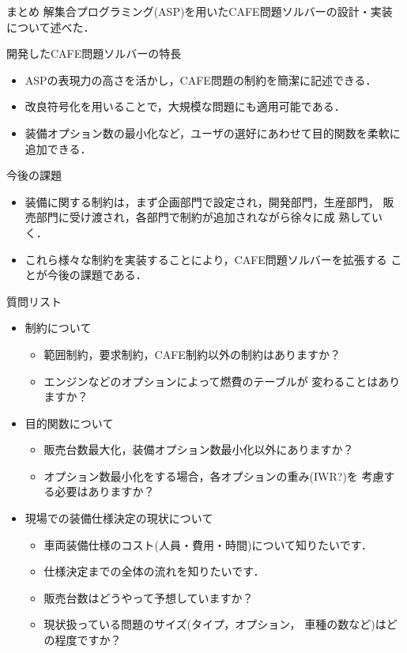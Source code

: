 \documentclass[dvipdfmx, 11pt]{beamer}
\begin{document}
\begin{frame}{まとめ}
 解集合プログラミング(ASP)を用いたCAFE問題ソルバーの設計・実装
 について述べた．
 \begin{alertblock}{開発したCAFE問題ソルバーの特長}
  \begin{itemize}
   \item {}
	 ASPの表現力の高さを活かし，CAFE問題の制約を簡潔に記述できる．
   \item {}
	 改良符号化を用いることで，大規模な問題にも適用可能である．
   \item {}
	 装備オプション数の最小化など，ユーザの選好にあわせて目的関数を柔軟に
	 追加できる．
  \end{itemize}
 \end{alertblock} 
\vfill
\begin{small}
\begin{block}{今後の課題}
\begin{itemize}
\item 装備に関する制約は，まず企画部門で設定され，開発部門，生産部門，
  販売部門に受け渡され，各部門で制約が追加されながら徐々に成
  熟していく．
\item これら様々な制約を実装することにより，CAFE問題ソルバーを拡張する
  ことが今後の課題である．
\end{itemize}
\end{block}
\end{small}
\end{frame}
\begin{frame}{質問リスト}
 \begin{itemize}
  \item 制約について
	\begin{itemize}
	 \item 範囲制約，要求制約，CAFE制約以外の制約はありますか？
	 \item エンジンなどのオプションによって燃費のテーブルが
	       変わることはありますか？
	\end{itemize}
  \item 目的関数について
	\begin{itemize}
	 \item 販売台数最大化，装備オプション数最小化以外にありますか？
	 \item オプション数最小化をする場合，各オプションの重み(IWR?)を
	       考慮する必要はありますか？
	\end{itemize}
  \item 現場での装備仕様決定の現状について
	\begin{itemize}
	 \item 車両装備仕様のコスト(人員・費用・時間)について知りたいです．
	 \item 仕様決定までの全体の流れを知りたいです．
	 \item 販売台数はどうやって予想していますか？
	 \item 現状扱っている問題のサイズ(タイプ，オプション，
	       車種の数など)はどの程度ですか？
	\end{itemize}
 \end{itemize}
\end{frame}
\end{document}
